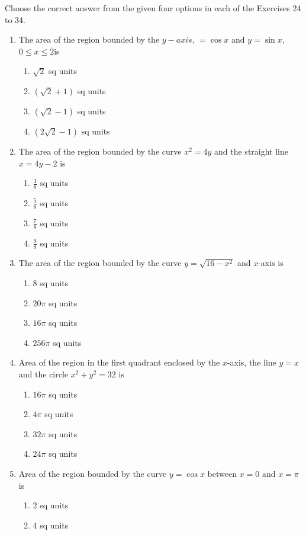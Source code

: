 \documentclass[12pt]{article}
\begin{document}
Choose the correct answer from the given four options in each of the Exercises 24 to 34.
\begin{enumerate}[resume]
\item The area of the region bounded by the $y - axis$, $ = \cos x\text{ and }y = \sin x$, $0 \leqslant x \leqslant \overline{2} $is
\begin{enumerate}
\item $\sqrt{2}$ sq units
\item $(\sqrt{2} + 1)$ sq units
\item $(\sqrt{2} - 1)$ sq units 
\item $(2\sqrt{2} - 1)$ sq units
\end{enumerate}
\item The area of the region bounded by the curve $x^2 = 4y$ and the straight line $x = 4y - 2$ is
\begin{enumerate}
\item $\frac{3}{8}$ sq units 
\item $\frac{5}{8}$ sq units
\item $\frac{7}{8}$ sq units 
\item $\frac{9}{8}$ sq units
\end{enumerate}
\item The area of the region bounded by the curve $y = \sqrt{16 - x^2}$ and $x$-axis is 
\begin{enumerate}
\item 8 sq units 
\item ${20\pi}$ sq units
\item ${16\pi}$ sq units
\item ${256\pi}$ sq units
\end{enumerate}
\item Area of the region in the first quadrant enclosed by the $x$-axis, the line $y = x$ and the circle $x^2 + y^2 = 32$ is 
\begin{enumerate}
\item ${16\pi}$ sq units 
\item ${4\pi}$ sq units
\item ${32\pi}$ sq units
\item ${24\pi}$ sq units
\end{enumerate}
\item Area of the region bounded by the curve $y = \cos x$ between $x = 0\text{ and }{x =\pi}$ is 
\begin{enumerate}
\item 2 sq units
\item 4 sq units

\end{enumerate}
\end{enumerate}
\end{document}

